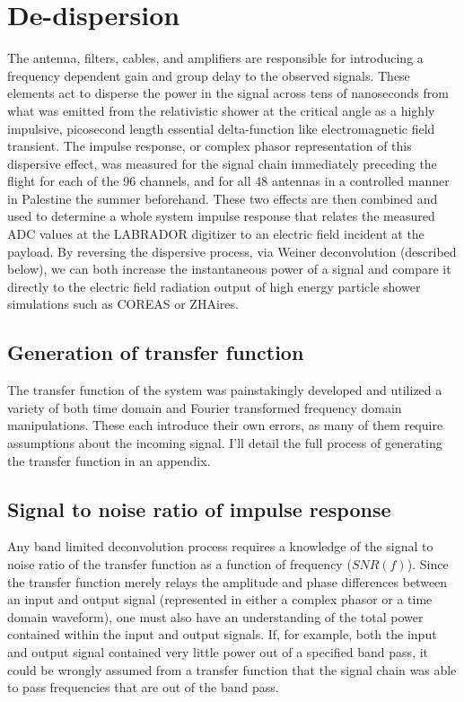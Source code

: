 \section{De-dispersion}%
	The antenna, filters, cables, and amplifiers are responsible for introducing a frequency dependent gain and group delay to the observed signals.  These elements act to disperse the power in the signal across tens of nanoseconds from what was emitted from the relativistic shower at the critical angle as a highly impulsive, picosecond length essential delta-function like electromagnetic field transient.  The impulse response, or complex phasor representation of this dispersive effect, was measured for the signal chain immediately preceding the flight for each of the 96 channels, and for all 48 antennas in a controlled manner in Palestine the summer beforehand.  These two effects are then combined and used to determine a whole system impulse response that relates the measured ADC values at the LABRADOR digitizer to an electric field incident at the payload.  By reversing the dispersive process, via Weiner deconvolution (described below), we can both increase the instantaneous power of a signal and compare it directly to the electric field radiation output of high energy particle shower simulations such as COREAS or ZHAires.


	\subsection{Generation of transfer function}
		The transfer function of the system was painstakingly developed and utilized a variety of both time domain and Fourier transformed frequency domain manipulations.  These each introduce their own errors, as many of them require assumptions about the incoming signal.  I'll detail the full process of generating the transfer function in an appendix.


	\subsection{Signal to noise ratio of impulse response}
		Any band limited deconvolution process requires a knowledge of the signal to noise ratio of the transfer function as a function of frequency ($SNR(f)$).  Since the transfer function merely relays the amplitude and phase differences between an input and output signal (represented in either a complex phasor or a time domain waveform), one must also have an understanding of the total power contained within the input and output signals.  If, for example, both the input and output signal contained very little power out of a specified band pass, it could be wrongly assumed from a transfer function that the signal chain was able to pass frequencies that are out of the band pass.
		

